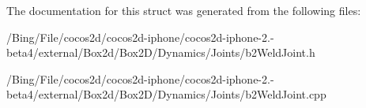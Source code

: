 The documentation for this struct was generated from the following files\-:\begin{DoxyCompactItemize}
\item 
/\-Bing/\-File/cocos2d/cocos2d-\/iphone/cocos2d-\/iphone-\/2.-\/beta4/external/\-Box2d/\-Box2\-D/\-Dynamics/\-Joints/b2\-Weld\-Joint.\-h\item 
/\-Bing/\-File/cocos2d/cocos2d-\/iphone/cocos2d-\/iphone-\/2.-\/beta4/external/\-Box2d/\-Box2\-D/\-Dynamics/\-Joints/b2\-Weld\-Joint.\-cpp\end{DoxyCompactItemize}
